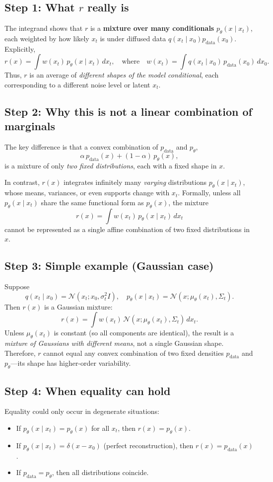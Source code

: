 \documentclass{article}
\begin{document}
\subsection*{Step 1: What $r$ really is}
The integrand shows that $r$ is a \textbf{mixture over many conditionals} $p_\theta(x \mid x_t)$,
each weighted by how likely $x_t$ is under diffused data $q(x_t \mid x_0)p_{\text{data}}(x_0)$.
Explicitly,
\[
r(x)
= \int w(x_t)\, p_\theta(x \mid x_t)\, dx_t,
\quad\text{where}\quad
w(x_t) = \int q(x_t \mid x_0)\, p_{\text{data}}(x_0)\, dx_0.
\]
Thus, $r$ is an average of \emph{different shapes of the model conditional}, each corresponding to a different noise level or latent $x_t$.

\subsection*{Step 2: Why this is not a linear combination of marginals}
The key difference is that a convex combination of $p_{\text{data}}$ and $p_\theta$,
\[
\alpha\,p_{\text{data}}(x) + (1-\alpha)\,p_\theta(x),
\]
is a mixture of only \emph{two fixed distributions}, each with a fixed shape in $x$.

In contrast, $r(x)$ integrates infinitely many \emph{varying} distributions
$p_\theta(x \mid x_t)$, whose means, variances, or even supports change with $x_t$.
Formally, unless all $p_\theta(x \mid x_t)$ share the same functional form as $p_\theta(x)$,
the mixture
\[
r(x) = \int w(x_t)\, p_\theta(x \mid x_t)\, dx_t
\]
cannot be represented as a single affine combination of two fixed distributions in $x$.

\subsection*{Step 3: Simple example (Gaussian case)}
Suppose
\[
q(x_t \mid x_0) = \mathcal{N}(x_t; x_0, \sigma_t^2 I),
\quad
p_\theta(x \mid x_t) = \mathcal{N}(x; \mu_\theta(x_t), \Sigma_t).
\]
Then $r(x)$ is a Gaussian mixture:
\[
r(x) = \int w(x_t)\, \mathcal{N}(x; \mu_\theta(x_t), \Sigma_t)\, dx_t.
\]
Unless $\mu_\theta(x_t)$ is constant (so all components are identical),
the result is a \emph{mixture of Gaussians with different means}, not a single Gaussian shape.
Therefore, $r$ cannot equal any convex combination of two fixed densities
$p_{\text{data}}$ and $p_\theta$—its shape has higher-order variability.

\subsection*{Step 4: When equality can hold}
Equality could only occur in degenerate situations:
\begin{itemize}
  \item If $p_\theta(x \mid x_t) = p_\theta(x)$ for all $x_t$, then $r(x) = p_\theta(x)$.
  \item If $p_\theta(x \mid x_t) = \delta(x - x_0)$ (perfect reconstruction), then $r(x) = p_{\text{data}}(x)$.
  \item If $p_{\text{data}} = p_\theta$, then all distributions coincide.
\end{itemize}
\end{document}
